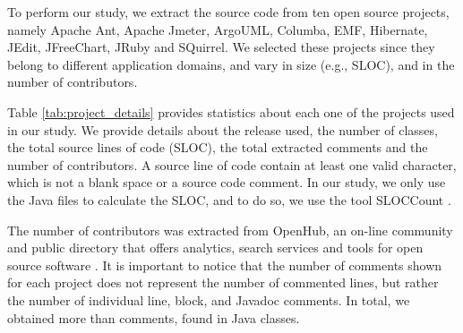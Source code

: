 To perform our study, we extract the source code from ten open source projects, namely Apache Ant, Apache Jmeter, ArgoUML, Columba, EMF, Hibernate, JEdit, JFreeChart, JRuby and SQuirrel. We selected these projects since they belong to different application domains, and vary in size (e.g., SLOC), and in the number of contributors.

Table \ref{tab:project_details} provides statistics about each one of the projects used in our study. We provide details about the release used, the number of classes, the total source lines of code (SLOC), the total extracted comments and the number of contributors. A source line of code contain at least one valid character, which is not a blank space or a source code comment. In our study, we only use the Java files to calculate the SLOC, and to do so, we use the tool SLOCCount \cite{wheeler2004:home}. 

The number of contributors was extracted from OpenHub, an on-line community and public directory that offers analytics, search services and tools for open source software \cite{Openhub:home}. It is important to notice that the number of comments shown for each project does not represent the number of commented lines, but rather the number of individual line, block, and Javadoc comments. In total, we obtained more than \todo{} comments, found in \todo{} Java classes.

